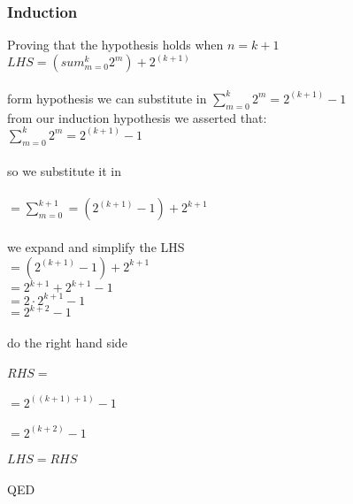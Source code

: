 \documentclass[english,10pt,a4paper]{report}
\begin{document}
\subsubsection{Induction }

Proving that the hypothesis holds when $n=k+1$\\



$ LHS =( sum_{m=0}^{k}   2^m)+ 2^{(k+1)} $\\\\
form hypothesis we can substitute in $ \sum_{m=0}^{k}   2^m = 2^{(k+1)} - 1 $\\


from our induction hypothesis we asserted that:\\
$ \sum_{m=0}^{k}   2^m = 2^{(k+1)} - 1 $\\\\
so we substitute it in\\\\
$=\sum_{m=0}^{k+1} =(2^{(k+1)} - 1)+2^{k+1}$ \\\\

we expand and simplify the LHS\\
$= (2^{(k+1)} - 1)+2^{k+1}$\\
$= 2^{k+1}+2^{k+1}-1$\\
$=2 \cdot 2^{k+1} -1$\\
$=2^{k+2} -1$\\\\
do the right hand side\\\\
$RHS =$\\\\
$= 2^{((k+1)+1)}-1$\\\\
	$=2^{(k+2)}-1 $\\\\
$LHS = RHS$\\\\
QED





 
 
 
\end{document}

